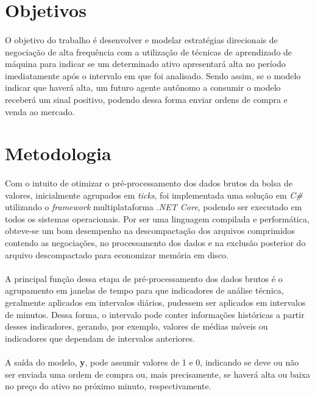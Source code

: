 \documentclass[grad,numbers]{coppe}
\begin{document}
  \section{Objetivos}
  
    \paragraph{}O objetivo do trabalho é desenvolver e modelar estratégias direcionais de negociação de alta frequência com a utilização de técnicas de aprendizado de máquina para indicar se um determinado ativo apresentará alta no período imediatamente após o intervalo em que foi analisado. Sendo assim, se o modelo indicar que haverá alta, um futuro agente autônomo a consumir o modelo receberá um sinal positivo, podendo dessa forma enviar ordens de compra e venda ao mercado. 
  
  \section{Metodologia}
  
    \paragraph{}Com o intuito de otimizar o pré-processamento dos dados brutos da bolsa de valores, inicialmente agrupados em \textit{ticks}, foi implementada uma solução em \textit{C\#} utilizando o \textit{framework} multiplataforma \textit{.NET Core}, podendo ser executado em todos os sistemas operacionais. Por ser uma linguagem compilada e performática, obteve-se um bom desempenho na descompactação dos arquivos comprimidos contendo as negociações, no processamento dos dados e na exclusão posterior do arquivo descompactado para economizar memória em disco.
    
    \paragraph{}A principal função dessa etapa de pré-processamento dos dados brutos é o agrupamento em janelas de tempo para que indicadores de análise técnica, geralmente aplicados em intervalos diários, pudessem ser aplicados em intervalos de minutos. Dessa forma, o intervalo pode conter informações históricas a partir desses indicadores, gerando, por exemplo, valores de médias móveis ou indicadores que dependam de intervalos anteriores. 
    
    \paragraph{}A saída do modelo, \textbf{y}, pode assumir valores de 1 e 0, indicando se deve ou não ser enviada uma ordem de compra ou, mais precisamente, se haverá alta ou baixa no preço do ativo no próximo minuto, respectivamente.
    
\end{document}
